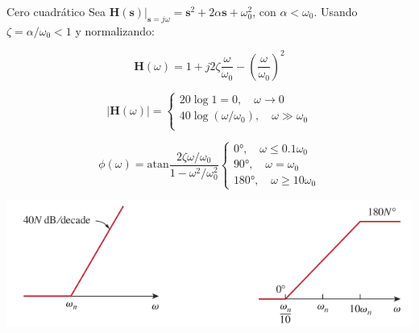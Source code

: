 \documentclass[xcolor={usenames,svgnames,dvipsnames}]{beamer}
\newcommand{\laplace}[1]{\mathbf{#1}(\mathbf{s})}
\newcommand{\slp}{\mathbf{s}}
\newcommand{\fasor}[1]{\mathbf{#1}(\omega)}
\newcommand{\atan}{\mathrm{atan}}
\begin{document}
\begin{frame}[label={sec:org2210e88}]{Cero cuadrático}
Sea \(\laplace{H}\rvert_{\slp = j\omega}  = \slp^2 + 2\alpha \slp + \omega_0^2\), con \(\alpha < \omega_0\). Usando \(\zeta = \alpha/\omega_0 < 1\) y normalizando:

\[
  \fasor{H} = 1 + j 2 \zeta \frac{\omega}{\omega_0} - \left(\frac{\omega}{\omega_0}\right)^2 
\]


\[
  |\fasor{H}| = 
  \begin{cases}
  20 \log 1 = 0, \quad \omega \to 0\\
  40 \log (\omega/\omega_0), \quad \omega \gg \omega_0\\
  \end{cases}
\]

\[
  \phi(\omega) = \atan \frac{2\zeta\omega/\omega_0}{1 - \omega^2/\omega_0^2}
  \begin{cases}
    \ang{0},\quad \omega \leq 0.1\omega_0\\
    \ang{90}, \quad \omega = \omega_0\\
    \ang{180}, \quad \omega \geq 10 \omega_0
  \end{cases}
\]


\begin{center}
\includegraphics[width=.9\linewidth]{../figs/BodeCeroCuadratico.pdf}
\end{center}
\end{frame}
\end{document}
